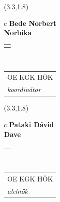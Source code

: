 \documentclass[11pt]{article}
\begin{document}
\makebox(3.3,1.8){
  \renewcommand\arraystretch{1.3}
  \begin{tabular}[c]{c}
    \hspace{8.5mm}
    \LARGE\bf{ Bede Norbert }\\
    \hspace{8.5mm}
    \Large{ Norbika }\\
    \renewcommand\arraystretch{3}
    \begin{tabular}[c]{c}
      \centering
      \fontfamily{phv}\selectfont{
        \textbf{
          \textsc{
            \scriptsize{
            \color{Dark}{ Ismerkedő }\color{Bright}{ Webmester }\color{Bright}{ Sminkmester }\color{Bright}{ Programozó }
            }
          }
        }
      }
    \end{tabular}
    \\
    \renewcommand\arraystretch{1}
    \begin{tabular}{p{3.3in}}
      \hspace{.7cm}OE KGK HÖK\\
      \hspace{.7cm}\emph{ koordinátor }\\
    \end{tabular}
  \end{tabular}
}

\makebox(3.3,1.8){
  \renewcommand\arraystretch{1.3}
  \begin{tabular}[c]{c}
    \hspace{8.5mm}
    \LARGE\bf{ Pataki Dávid }\\
    \hspace{8.5mm}
    \Large{ Dave }\\
    \renewcommand\arraystretch{3}
    \begin{tabular}[c]{c}
      \centering
      \fontfamily{phv}\selectfont{
        \textbf{
          \textsc{
            \scriptsize{
            \color{Dark}{ Ismerkedő }\color{Bright}{ Webmester }\color{Bright}{ Sminkmester }\color{Bright}{ Programozó }
            }
          }
        }
      }
    \end{tabular}
    \\
    \renewcommand\arraystretch{1}
    \begin{tabular}{p{3.3in}}
      \hspace{.7cm}OE KGK HÖK\\
      \hspace{.7cm}\emph{ alelnök }\\
    \end{tabular}
  \end{tabular}
}
\end{document}
